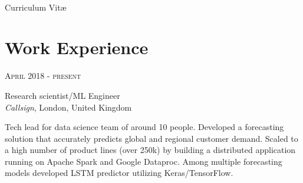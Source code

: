 \documentclass[10pt]{article} %
\begin{document}
\color{text1} %


\par{\\ %
{\color{headings} Curriculum {Vit\ae}\\[15pt]\par} %


\begin{minipage}[t]{0.5\textwidth} %
\vspace{0pt} %


\section{Work Experience}


\vspace{0.5cm}
{\raggedleft\textsc{April 2018 - present}\par}

{\raggedright\large Research scientist/ML Engineer\\
\textit{Callsign}, London, United Kingdom\\[5pt]}

\normalsize{Tech lead for data science team of around 10 people. 
Developed a forecasting solution that accurately predicts global 
and regional customer demand. Scaled to a high number of product 
lines (over 250k) by building a distributed application running 
on Apache Spark and Google Dataproc. Among multiple forecasting models 
developed LSTM predictor utilizing Keras/TensorFlow.
\\

}
\end{minipage}}
\end{document}
